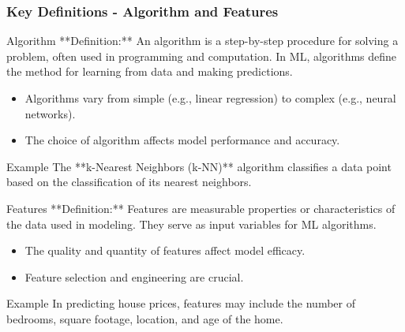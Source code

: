\documentclass[aspectratio=169]{beamer}
\begin{document}
\begin{frame}[fragile]
    \frametitle{Key Definitions - Algorithm and Features}
    \begin{block}{Algorithm}
        **Definition:**  
        An algorithm is a step-by-step procedure for solving a problem, often used in programming and computation. In ML, algorithms define the method for learning from data and making predictions.
    \end{block}
    \begin{itemize}
        \item Algorithms vary from simple (e.g., linear regression) to complex (e.g., neural networks).
        \item The choice of algorithm affects model performance and accuracy.
    \end{itemize}
    \begin{block}{Example}
        The **k-Nearest Neighbors (k-NN)** algorithm classifies a data point based on the classification of its nearest neighbors.
    \end{block}
    
    \begin{block}{Features}
        **Definition:**  
        Features are measurable properties or characteristics of the data used in modeling. They serve as input variables for ML algorithms.
    \end{block}
    \begin{itemize}
        \item The quality and quantity of features affect model efficacy.
        \item Feature selection and engineering are crucial.
    \end{itemize}
    \begin{block}{Example}
        In predicting house prices, features may include the number of bedrooms, square footage, location, and age of the home.
    \end{block}
\end{frame}
\end{document}

